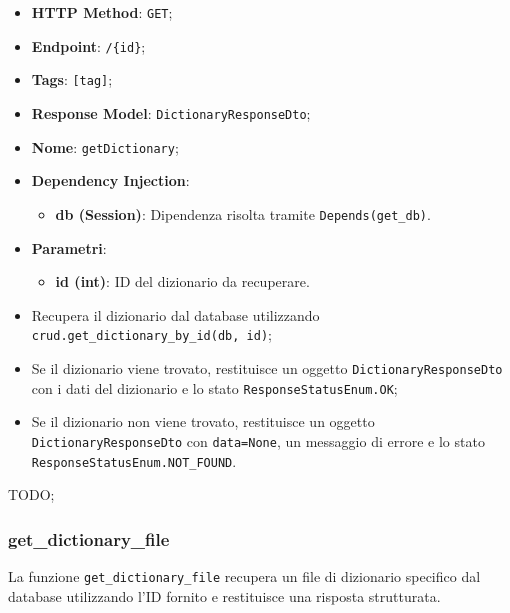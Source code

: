 \begin{itemize}
 \item \textbf{HTTP Method}: \texttt{GET};
 \item \textbf{Endpoint}: \texttt{/\{id\}};
 \item \textbf{Tags}: \texttt{[tag]};
 \item \textbf{Response Model}: \texttt{DictionaryResponseDto};
 \item \textbf{Nome}: \texttt{getDictionary};
 \item \textbf{Dependency Injection}:
  \begin{itemize}
    \item \textbf{db (Session)}: Dipendenza risolta tramite \texttt{Depends(get\_db)}.
  \end{itemize}
 \item \textbf{Parametri}:
  \begin{itemize}
    \item \textbf{id (int)}: ID del dizionario da recuperare.
  \end{itemize}
\end{itemize}

\begin{itemize}
 \item Recupera il dizionario dal database utilizzando \texttt{crud.get\_dictionary\_by\_id(db, id)};
 \item Se il dizionario viene trovato, restituisce un oggetto \texttt{DictionaryResponseDto} con i dati del dizionario e lo stato \texttt{ResponseStatusEnum.OK};
 \item Se il dizionario non viene trovato, restituisce un oggetto \texttt{DictionaryResponseDto} con \texttt{data=None}, un messaggio di errore e lo stato \texttt{ResponseStatusEnum.NOT\_FOUND}.
\end{itemize}

\par TODO;

\subsubsection{get\_dictionary\_file}

\par La funzione \texttt{get\_dictionary\_file} recupera un file di dizionario specifico dal database utilizzando l'ID fornito e restituisce una risposta strutturata.

